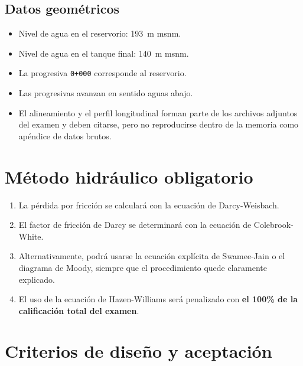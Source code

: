 \documentclass[11pt]{article}
\begin{document}
\subsection{Datos geométricos}
\begin{itemize}
\item Nivel de agua en el reservorio: \SI{193}{\meter} msnm.
\item Nivel de agua en el tanque final: \SI{140}{\meter} msnm.
\item La progresiva \texttt{0+000} corresponde al reservorio.
\item Las progresivas avanzan en sentido aguas abajo.
\item El alineamiento y el perfil longitudinal forman parte de los archivos adjuntos del examen y deben citarse, pero no reproducirse dentro de la memoria como apéndice de datos brutos.
\end{itemize}

\section{Método hidráulico obligatorio}
\begin{enumerate}
\item La pérdida por fricción se calculará con la ecuación de Darcy-Weisbach.
\item El factor de fricción de Darcy se determinará con la ecuación de Colebrook-White.
\item Alternativamente, podrá usarse la ecuación explícita de Swamee-Jain o el diagrama de Moody, siempre que el procedimiento quede claramente explicado.
\item El uso de la ecuación de Hazen-Williams será penalizado con \textbf{el 100\% de la calificación total del examen}.
\end{enumerate}

\section{Criterios de diseño y aceptación}
\end{document}
